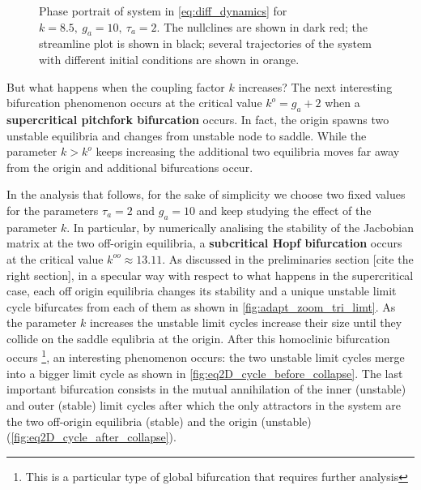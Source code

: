 \begin{figure}[H]
        \caption{\label{fig:eq2D_cycle} Phase portrait of system in \eqref{eq:diff_dynamics} for $k=8.5,\ g_a=10,\ \tau_a=2$. The nullclines are shown in dark red; the streamline plot is shown in black; several trajectories of the system with different initial conditions are shown in orange.}
\end{figure}

But what happens when the coupling factor $k$ increases? The next interesting bifurcation phenomenon occurs at the critical value $k^o = g_a + 2$ when a \textbf{supercritical pitchfork bifurcation} occurs. In fact, the origin spawns two unstable equilibria and changes from unstable node to saddle. While the parameter $k > k^o$ keeps increasing the additional two equilibria moves far away from the origin and additional bifurcations occur.

In the analysis that follows, for the sake of simplicity we choose two fixed values for the parameters $\tau_a=2$ and $g_a=10$ and keep studying the effect of the parameter $k$.
In particular, by numerically analising the stability of the Jacbobian matrix at the two off-origin equilibria, a \textbf{subcritical Hopf bifurcation} occurs at the critical value $k^{oo} \approx 13.11$. As discussed in the preliminaries section [cite the right section], in a specular way with respect to what happens in the supercritical case, each off origin equilibria changes its stability and a unique unstable limit cycle bifurcates from each of them as shown in \cref{fig:adapt_zoom_tri_limt}. As the parameter $k$ increases the unstable limit cycles increase their size until they collide on the saddle equlibria at the origin. After this homoclinic bifurcation occurs \footnote{This is a particular type of global bifurcation that requires further analysis},
 an interesting phenomenon occurs: the two unstable limit cycles merge into a bigger limit cycle as shown in \cref{fig:eq2D_cycle_before_collapse}. The last important bifurcation consists in the mutual annihilation of the inner (unstable) and outer (stable) limit cycles after which the only attractors in the system are the two off-origin equilibria (stable) and the origin (unstable) (\cref{fig:eq2D_cycle_after_collapse}).

